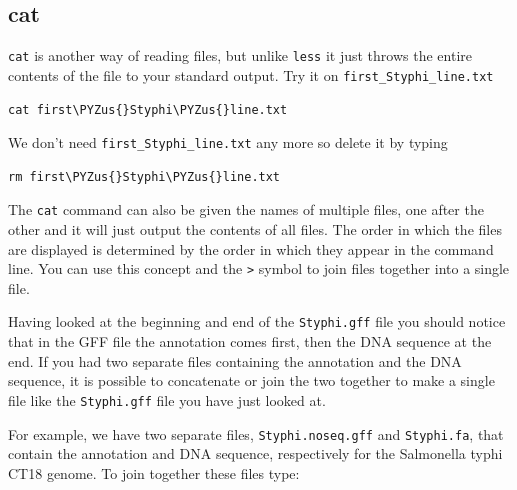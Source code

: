 \documentclass[11pt]{article}
\makeatletter
\def\PYZus{\char`\_}
\newcommand{\boxspacing}{\kern\kvtcb@left@rule\kern\kvtcb@boxsep}
\newcommand{\prompt}[4]{
       \ttfamily\llap{{\color{#2}\LARGE\faKeyboardO\hspace{3pt}#4}}\vspace{-\baselineskip}
    }
\makeatother
\begin{document}
    \hypertarget{cat}{%
\subsection{cat}\label{cat}}

\texttt{cat} is another way of reading files, but unlike \texttt{less}
it just throws the entire contents of the file to your standard output.
Try it on \texttt{first\_Styphi\_line.txt}

    \begin{tcolorbox}[breakable, size=fbox, boxrule=1pt, pad at break*=1mm,colback=cellbackground, colframe=cellborder]
\prompt{In}{incolor}{ }{\boxspacing}
\begin{Verbatim}[commandchars=\\\{\}]
cat first\PYZus{}Styphi\PYZus{}line.txt
\end{Verbatim}
\end{tcolorbox}

    We don't need \texttt{first\_Styphi\_line.txt} any more so delete it by
typing

    \begin{tcolorbox}[breakable, size=fbox, boxrule=1pt, pad at break*=1mm,colback=cellbackground, colframe=cellborder]
\prompt{In}{incolor}{ }{\boxspacing}
\begin{Verbatim}[commandchars=\\\{\}]
rm first\PYZus{}Styphi\PYZus{}line.txt
\end{Verbatim}
\end{tcolorbox}

    The \texttt{cat} command can also be given the names of multiple files,
one after the other and it will just output the contents of all files.
The order in which the files are displayed is determined by the order in
which they appear in the command line. You can use this concept and the
\texttt{\textgreater{}} symbol to join files together into a single
file.

Having looked at the beginning and end of the \texttt{Styphi.gff} file
you should notice that in the GFF file the annotation comes first, then
the DNA sequence at the end. If you had two separate files containing
the annotation and the DNA sequence, it is possible to concatenate or
join the two together to make a single file like the \texttt{Styphi.gff}
file you have just looked at.

For example, we have two separate files, \texttt{Styphi.noseq.gff} and
\texttt{Styphi.fa}, that contain the annotation and DNA sequence,
respectively for the Salmonella typhi CT18 genome. To join together
these files type:
\end{document}
